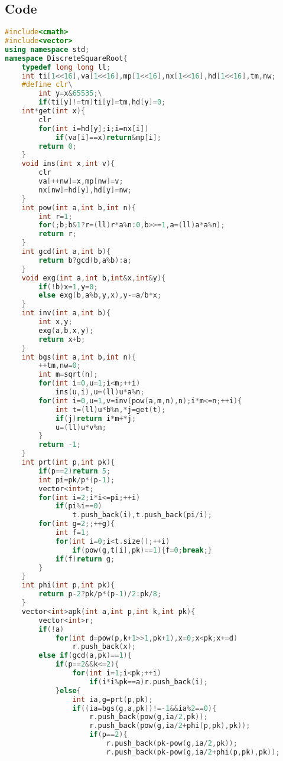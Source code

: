 \documentclass{book}
\begin{document}
\subsection*{Code}
\begin{lstlisting}[language=C++,title={Discrete Square Root.hpp (3692 bytes, 122 lines)}]
#include<cmath>
#include<vector>
using namespace std;
namespace DiscreteSquareRoot{
    typedef long long ll;
    int ti[1<<16],va[1<<16],mp[1<<16],nx[1<<16],hd[1<<16],tm,nw;
    #define clr\
        int y=x&65535;\
        if(ti[y]!=tm)ti[y]=tm,hd[y]=0;
    int*get(int x){
        clr
        for(int i=hd[y];i;i=nx[i])
            if(va[i]==x)return&mp[i];
        return 0;
    }
    void ins(int x,int v){
        clr
        va[++nw]=x,mp[nw]=v;
        nx[nw]=hd[y],hd[y]=nw;
    }
    int pow(int a,int b,int n){
        int r=1;
        for(;b;b&1?r=(ll)r*a%n:0,b>>=1,a=(ll)a*a%n);
        return r;
    }
    int gcd(int a,int b){
        return b?gcd(b,a%b):a;
    }
    void exg(int a,int b,int&x,int&y){
        if(!b)x=1,y=0;
        else exg(b,a%b,y,x),y-=a/b*x;
    }
    int inv(int a,int b){
        int x,y;
        exg(a,b,x,y);
        return x+b;
    }
    int bgs(int a,int b,int n){
        ++tm,nw=0;
        int m=sqrt(n);
        for(int i=0,u=1;i<m;++i)
            ins(u,i),u=(ll)u*a%n;
        for(int i=0,u=1,v=inv(pow(a,m,n),n);i*m<=n;++i){
            int t=(ll)u*b%n,*j=get(t);
            if(j)return i*m+*j;
            u=(ll)u*v%n;
        }
        return -1;
    }
    int prt(int p,int pk){
        if(p==2)return 5;
        int pi=pk/p*(p-1);
        vector<int>t;
        for(int i=2;i*i<=pi;++i)
            if(pi%i==0)
                t.push_back(i),t.push_back(pi/i);
        for(int g=2;;++g){
            int f=1;
            for(int i=0;i<t.size();++i)
                if(pow(g,t[i],pk)==1){f=0;break;}
            if(f)return g;
        }
    }
    int phi(int p,int pk){
        return p-2?pk/p*(p-1)/2:pk/8;
    }
    vector<int>apk(int a,int p,int k,int pk){
        vector<int>r;
        if(!a)
            for(int d=pow(p,k+1>>1,pk+1),x=0;x<pk;x+=d)
                r.push_back(x);
        else if(gcd(a,pk)==1){
            if(p==2&&k<=2){
                for(int i=1;i<pk;++i)
                    if(i*i%pk==a)r.push_back(i);
            }else{
                int ia,g=prt(p,pk);
                if((ia=bgs(g,a,pk))!=-1&&ia%2==0){
                    r.push_back(pow(g,ia/2,pk));
                    r.push_back(pow(g,ia/2+phi(p,pk),pk));
                    if(p==2){
                        r.push_back(pk-pow(g,ia/2,pk));
                        r.push_back(pk-pow(g,ia/2+phi(p,pk),pk));

\end{lstlisting}
\end{document}
